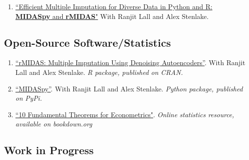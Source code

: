 \documentclass[11pt, a4paper]{article}
\begin{document}
\begin{enumerate}
\item \href{}{``Efficient Multiple Imputation for Diverse Data in Python and R: \textbf{MIDASpy} and \textbf{rMIDAS}"} With Ranjit Lall and Alex Stenlake.

\end{enumerate}

\subsection*{Open-Source Software/Statistics}

\begin{enumerate}

  \item \href{https://CRAN.R-project.org/package=rMIDAS}{``rMIDAS: Multiple Imputation Using Denoising Autoencoders''}. With Ranjit Lall and Alex Stenlake. \textit{R package, published on CRAN.}

  \item \href{https://pypi.org/project/MIDASpy/}{``MIDASpy''}. With Ranjit Lall and Alex Stenlake. \textit{Python package, published on PyPi.}

  \item \href{https://bookdown.org/ts_robinson1994/10_fundamental_theorems_for_econometrics/vtDma6bZJ/}{``10 Fundamental Theorems for Econometrics"}. \textit{Online statistics resource, available on bookdown.org}

\end{enumerate}


\subsection*{Work in Progress}
\end{document}
